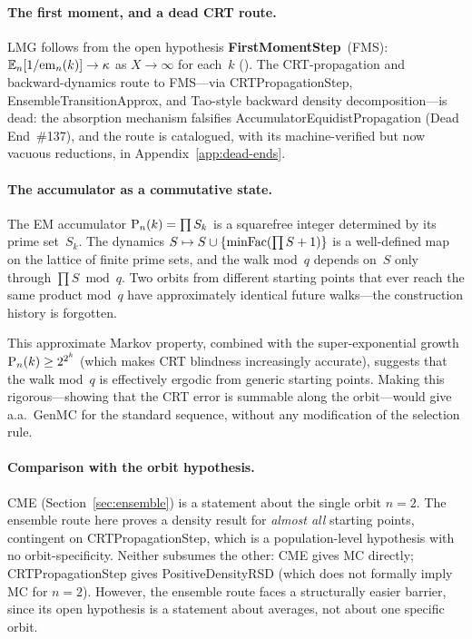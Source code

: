 \paragraph{The first moment, and a dead CRT route.}
LMG follows from the open hypothesis
\textbf{FirstMomentStep}~(FMS):
$\mathbb{E}_n[1/\mathrm{em}_{n}(k)] \to \kappa$ as $X \to \infty$ for each~$k$
().
The CRT-propagation and backward-dynamics route to FMS---via
CRTPropagationStep, EnsembleTransitionApprox, and Tao-style backward
density decomposition---is dead: the absorption mechanism falsifies
AccumulatorEquidistPropagation (Dead End~\#137), and the route is
catalogued, with its machine-verified but now vacuous reductions, in
Appendix~\ref{app:dead-ends}.

\paragraph{The accumulator as a commutative state.}
The EM accumulator $\mathrm{P}_{n}(k) = \prod S_k$ is a squarefree integer
determined by its prime set~$S_k$.  The dynamics
$S \mapsto S \cup \{\mathrm{minFac}(\prod S + 1)\}$ is a well-defined map on
the lattice of finite prime sets, and the walk mod~$q$ depends on~$S$
only through $\prod S \bmod q$.  Two orbits from different starting
points that ever reach the same product mod~$q$ have approximately
identical future walks---the construction history is forgotten.

This approximate Markov property, combined with the super-exponential
growth $\mathrm{P}_{n}(k) \geq 2^{2^k}$ (which makes CRT blindness
increasingly accurate), suggests that the walk mod~$q$ is effectively
ergodic from generic starting points.  Making this rigorous---showing
that the CRT error is summable along the orbit---would give a.a.\
$\mathrm{GenMC}$ for the standard sequence, without any modification
of the selection rule.

\paragraph{Comparison with the orbit hypothesis.}
CME (Section~\ref{sec:ensemble}) is a statement about the single
orbit $n = 2$.
The ensemble route here proves a density result for \emph{almost all}
starting points, contingent on CRTPropagationStep, which is a
population-level hypothesis with no orbit-specificity.
Neither subsumes the other: CME gives MC directly; CRTPropagationStep
gives PositiveDensityRSD (which does not formally imply MC for $n = 2$).
However, the ensemble route faces a structurally easier barrier, since
its open hypothesis is a statement about averages, not about one
specific orbit.

